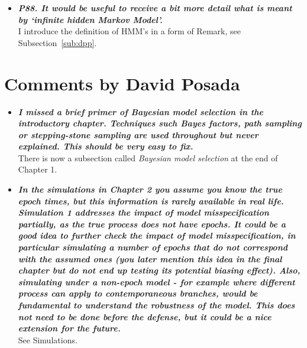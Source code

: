 \documentclass[english]{article}
\begin{document}
\begin{itemize}
\item {
{\it
\textbf{
P88. It would be useful to receive a bit more detail what is meant by `infinite hidden Markov Model'.
}%
}%
}%
\\
I introduce the definition of HMM's in a form of Remark, see Subsection~\ref{sub:dpp}.



\end{itemize}


\section*{Comments by David Posada}

\begin{itemize}

\item {
{\it
\textbf{
I missed a brief primer of Bayesian model selection in the introductory chapter.
Techniques such Bayes factors, path sampling or stepping-stone sampling are used throughout but never explained. 
This should be very easy to fix.
}%
}%
}%
\\
There is now a subsection called \emph{Bayesian model selection} at the end of Chapter 1.



\item {
{\it
\textbf{
In the simulations in Chapter 2 you assume you know the true epoch times, but this information is rarely available in real life. 
Simulation 1 addresses the impact of model misspecification partially, as the true process does not have epochs. 
It could be a good idea to further check the impact of model misspecification, in particular simulating a number of epochs that do not correspond with the assumed ones (you later mention this idea in the final chapter but do not end up testing its potential biasing effect). 
Also, simulating under a non-epoch model - for example where different process can apply to contemporaneous branches, would be fundamental to understand the robustness of the model. 
This does not need to be done before the defense, but it could be a nice extension for the future.
}%
}%
}%
\\
See Simulations.



\end{itemize}
\end{document}
